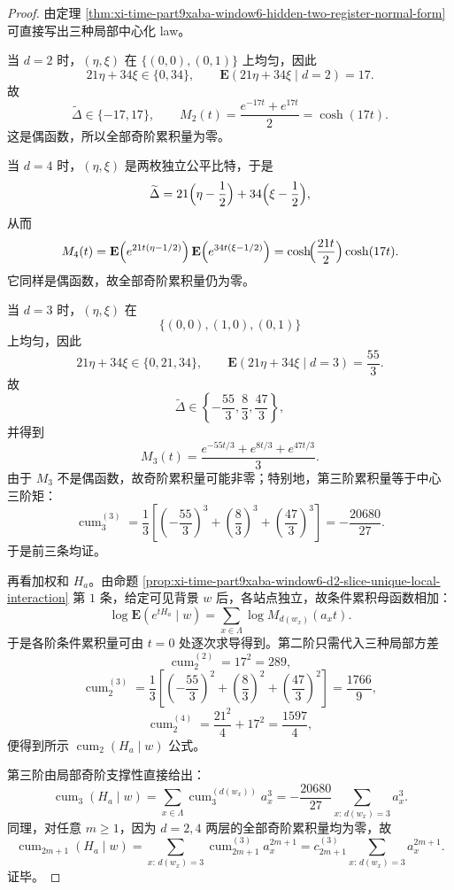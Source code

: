 \begin{proof}
由定理 \ref{thm:xi-time-part9xaba-window6-hidden-two-register-normal-form} 可直接写出三种局部中心化 law。

当 \(d=2\) 时，\((\eta,\xi)\) 在 \(\{(0,0),(0,1)\}\) 上均匀，因此
\[
21\eta+34\xi\in\{0,34\},
\qquad
\mathbf E(21\eta+34\xi\mid d=2)=17.
\]
故
\[
\widetilde\Delta\in\{-17,17\},
\qquad
M_2(t)=\frac{e^{-17t}+e^{17t}}2=\cosh(17t).
\]
这是偶函数，所以全部奇阶累积量为零。

当 \(d=4\) 时，\((\eta,\xi)\) 是两枚独立公平比特，于是
\[
\widetilde\Delta
=
21\Bigl(\eta-\frac12\Bigr)+34\Bigl(\xi-\frac12\Bigr),
\]
从而
\[
M_4(t)
=
\mathbf E\!\left(e^{21t(\eta-1/2)}\right)
\mathbf E\!\left(e^{34t(\xi-1/2)}\right)
=
\cosh\!\Bigl(\frac{21t}{2}\Bigr)\cosh(17t).
\]
它同样是偶函数，故全部奇阶累积量仍为零。

当 \(d=3\) 时，\((\eta,\xi)\) 在
\[
\{(0,0),(1,0),(0,1)\}
\]
上均匀，因此
\[
21\eta+34\xi\in\{0,21,34\},
\qquad
\mathbf E(21\eta+34\xi\mid d=3)=\frac{55}{3}.
\]
故
\[
\widetilde\Delta\in\left\{-\frac{55}{3},\frac{8}{3},\frac{47}{3}\right\},
\]
并得到
\[
M_3(t)=\frac{e^{-55t/3}+e^{8t/3}+e^{47t/3}}{3}.
\]
由于 \(M_3\) 不是偶函数，故奇阶累积量可能非零；特别地，第三阶累积量等于中心三阶矩：
\[
\operatorname{cum}_3^{(3)}
=
\frac{1}{3}\left[
\left(-\frac{55}{3}\right)^3
+
\left(\frac{8}{3}\right)^3
+
\left(\frac{47}{3}\right)^3
\right]
=
-\frac{20680}{27}.
\]
于是前三条均证。

再看加权和 \(H_a\)。由命题 \ref{prop:xi-time-part9xaba-window6-d2-slice-unique-local-interaction} 第 \(1\) 条，给定可见背景 \(w\) 后，各站点独立，故条件累积母函数相加：
\[
\log \mathbf E(e^{tH_a}\mid w)
=
\sum_{x\in\Lambda}\log M_{d(w_x)}(a_xt).
\]
于是各阶条件累积量可由 \(t=0\) 处逐次求导得到。第二阶只需代入三种局部方差
\[
\operatorname{cum}_2^{(2)}=17^2=289,
\]
\[
\operatorname{cum}_2^{(3)}
=
\frac{1}{3}\left[
\left(-\frac{55}{3}\right)^2
+
\left(\frac{8}{3}\right)^2
+
\left(\frac{47}{3}\right)^2
\right]
=
\frac{1766}{9},
\]
\[
\operatorname{cum}_2^{(4)}
=
\frac{21^2}{4}+17^2
=
\frac{1597}{4},
\]
便得到所示
\(\operatorname{cum}_2(H_a\mid w)\) 公式。

第三阶由局部奇阶支撑性直接给出：
\[
\operatorname{cum}_3(H_a\mid w)
=
\sum_{x\in\Lambda}\operatorname{cum}_3^{(d(w_x))}a_x^3
=
-\frac{20680}{27}\sum_{x:\,d(w_x)=3}a_x^3.
\]
同理，对任意 \(m\ge 1\)，因为 \(d=2,4\) 两层的全部奇阶累积量均为零，故
\[
\operatorname{cum}_{2m+1}(H_a\mid w)
=
\sum_{x:\,d(w_x)=3}\operatorname{cum}_{2m+1}^{(3)}a_x^{2m+1}
=
c_{2m+1}^{(3)}
\sum_{x:\,d(w_x)=3}a_x^{2m+1}.
\]
证毕。
\end{proof}


